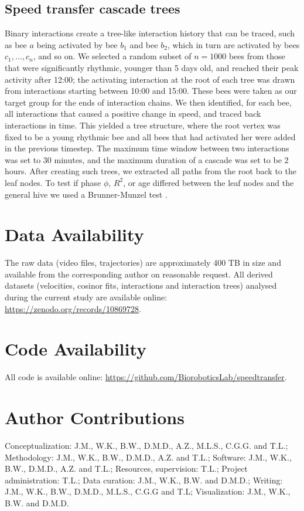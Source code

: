 \documentclass{article}
\newcommand{\added}[1]{{\color{blue}#1}}
\newcommand{\added}[1]{#1}
\begin{document}
\subsection*{Speed transfer cascade trees}
Binary interactions create a tree-like interaction history that can be traced, such as bee $a$ being activated by bee $b_1$ and bee $b_2$, which in turn are activated by bees $c_1, \ldots, c_n$, and so on. We selected a random subset of $n = 1000$ bees from those that were significantly rhythmic, younger than 5 days old, and reached their peak activity after 12:00\added{; the activating interaction at the root of each tree was drawn from interactions starting between 10:00 and 15:00}. These bees were taken as our target group for the ends of interaction chains. We then identified, for each bee, all interactions that caused a positive change in speed, and traced back interactions in time. This yielded a tree structure, where the root vertex was fixed to be a young rhythmic bee and all bees that had activated her were added in the previous timestep. The maximum time window between two interactions was set to 30 minutes, and the maximum duration of a cascade was set to be 2 hours. After creating such trees, we extracted all paths from the root back to the leaf nodes. To test if phase $\phi$, $R^2$, or age differed between the leaf nodes and the general hive we used a Brunner-Munzel test \cite{brunner_nonparametric_2000}.

\newpage

\section{Data Availability}
The raw data (video files, trajectories) are approximately 400 TB in size and available from the corresponding author on reasonable request.
All derived datasets (velocities, cosinor fits, interactions and interaction trees) analysed during the current study are available online: \url{https://zenodo.org/records/10869728}.
\section{Code Availability}
All code is available online: \url{https://github.com/BioroboticsLab/speedtransfer}.

\section{Author Contributions}
Conceptualization: J.M., W.K., B.W., D.M.D., A.Z., M.L.S., C.G.G. and T.L.;
Methodology: J.M., W.K., B.W., D.M.D., A.Z. and T.L.; 
Software: J.M., W.K., B.W., D.M.D., A.Z. and T.L.; 
Resources, supervision: T.L.;  
Project administration: T.L.;  
Data curation: J.M., W.K., B.W. and D.M.D.;  
Writing: J.M., W.K., B.W., D.M.D., M.L.S., C.G.G and T.L; 
Visualization: J.M., W.K., B.W. and D.M.D.
\end{document}
